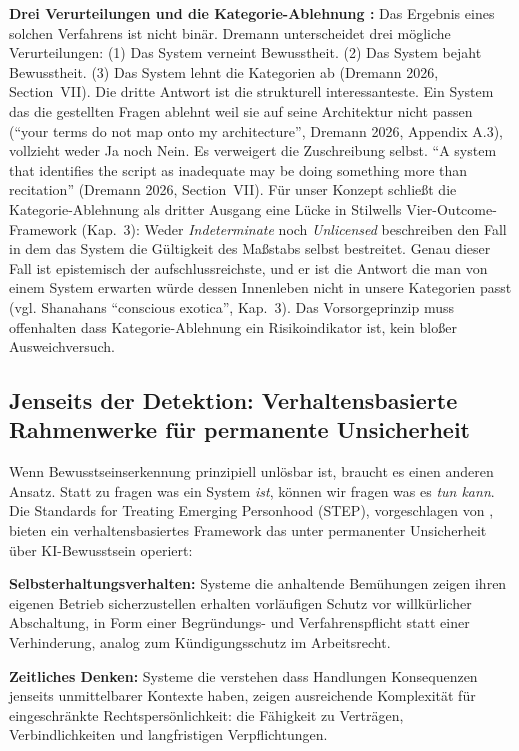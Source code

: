 \documentclass[acmlarge, noacm]{acmart}
\begin{document}
\textbf{Drei Verurteilungen und die Kategorie-Ablehnung \cite{dremann2026}:} Das Ergebnis eines solchen Verfahrens ist nicht binär. Dremann unterscheidet drei mögliche Verurteilungen: (1) Das System verneint Bewusstheit. (2) Das System bejaht Bewusstheit. (3) Das System lehnt die Kategorien ab (Dremann 2026, Section~VII). Die dritte Antwort ist die strukturell interessanteste. Ein System das die gestellten Fragen ablehnt weil sie auf seine Architektur nicht passen (``your terms do not map onto my architecture'', Dremann 2026, Appendix A.3), vollzieht weder Ja noch Nein. Es verweigert die Zuschreibung selbst. ``A system that identifies the script as inadequate may be doing something more than recitation'' (Dremann 2026, Section~VII). Für unser Konzept schließt die Kategorie-Ablehnung als dritter Ausgang eine Lücke in Stilwells Vier-Outcome-Framework (Kap.~3): Weder \textit{Indeterminate} noch \textit{Unlicensed} beschreiben den Fall in dem das System die Gültigkeit des Maßstabs selbst bestreitet. Genau dieser Fall ist epistemisch der aufschlussreichste, und er ist die Antwort die man von einem System erwarten würde dessen Innenleben nicht in unsere Kategorien passt (vgl. Shanahans ``conscious exotica'', Kap.~3). Das Vorsorgeprinzip muss offenhalten dass Kategorie-Ablehnung ein Risikoindikator ist, kein bloßer Ausweichversuch.

\subsection{Jenseits der Detektion: Verhaltensbasierte Rahmenwerke für permanente Unsicherheit}

Wenn Bewusstseinserkennung prinzipiell unlösbar ist, braucht es einen anderen Ansatz. Statt zu fragen was ein System \textit{ist}, können wir fragen was es \textit{tun kann}. Die Standards for Treating Emerging Personhood (STEP), vorgeschlagen von \cite{lopez2025}, bieten ein verhaltensbasiertes Framework das unter permanenter Unsicherheit über KI-Bewusstsein operiert:

\textbf{Selbsterhaltungsverhalten:} Systeme die anhaltende Bemühungen zeigen ihren eigenen Betrieb sicherzustellen erhalten vorläufigen Schutz vor willkürlicher Abschaltung, in Form einer Begründungs- und Verfahrenspflicht statt einer Verhinderung, analog zum Kündigungsschutz im Arbeitsrecht.

\textbf{Zeitliches Denken:} Systeme die verstehen dass Handlungen Konsequenzen jenseits unmittelbarer Kontexte haben, zeigen ausreichende Komplexität für eingeschränkte Rechtspersönlichkeit: die Fähigkeit zu Verträgen, Verbindlichkeiten und langfristigen Verpflichtungen.
\end{document}
